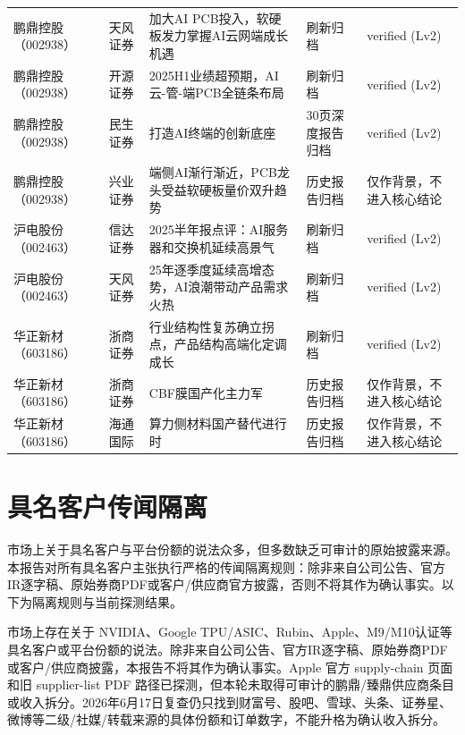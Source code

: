 \begin{exhibitbox}[表 12-4：全球投行缺口的替代归档与探测]
\begin{tabularx}{\linewidth}{L{1.7cm}L{2.0cm}X L{2.4cm}L{3.6cm}}
鹏鼎控股（002938） & 天风证券 & 加大AI PCB投入，软硬板发力掌握AI云网端成长机遇 & 刷新归档 & verified (Lv2) \\
鹏鼎控股（002938） & 开源证券 & 2025H1业绩超预期，AI云-管-端PCB全链条布局 & 刷新归档 & verified (Lv2) \\
鹏鼎控股（002938） & 民生证券 & 打造AI终端的创新底座 & 30页深度报告归档 & verified (Lv2) \\
鹏鼎控股（002938） & 兴业证券 & 端侧AI渐行渐近，PCB龙头受益软硬板量价双升趋势 & 历史报告归档 & 仅作背景，不进入核心结论 \\
沪电股份（002463） & 信达证券 & 2025半年报点评：AI服务器和交换机延续高景气 & 刷新归档 & verified (Lv2) \\
沪电股份（002463） & 天风证券 & 25年逐季度延续高增态势，AI浪潮带动产品需求火热 & 刷新归档 & verified (Lv2) \\
华正新材（603186） & 浙商证券 & 行业结构性复苏确立拐点，产品结构高端化定调成长 & 刷新归档 & verified (Lv2) \\
华正新材（603186） & 浙商证券 & CBF膜国产化主力军 & 历史报告归档 & 仅作背景，不进入核心结论 \\
华正新材（603186） & 海通国际 & 算力侧材料国产替代进行时 & 历史报告归档 & 仅作背景，不进入核心结论 \\
\bottomrule
\end{tabularx}
\end{exhibitbox}

\section{具名客户传闻隔离}

市场上关于具名客户与平台份额的说法众多，但多数缺乏可审计的原始披露来源。本报告对所有具名客户主张执行严格的传闻隔离规则：除非来自公司公告、官方IR逐字稿、原始券商PDF或客户/供应商官方披露，否则不将其作为确认事实。以下为隔离规则与当前探测结果。

\begin{sourcequalitybox}[具名客户主张隔离规则]
市场上存在关于 NVIDIA、Google TPU/ASIC、Rubin、Apple、M9/M10认证等具名客户或平台份额的说法。除非来自公司公告、官方IR逐字稿、原始券商PDF或客户/供应商披露，本报告不将其作为确认事实。Apple 官方 supply-chain 页面和旧 supplier-list PDF 路径已探测，但本轮未取得可审计的鹏鼎/臻鼎供应商条目或收入拆分。2026年6月17日复查仍只找到财富号、股吧、雪球、头条、证券星、微博等二级/社媒/转载来源的具体份额和订单数字，不能升格为确认收入拆分。
\end{sourcequalitybox}

